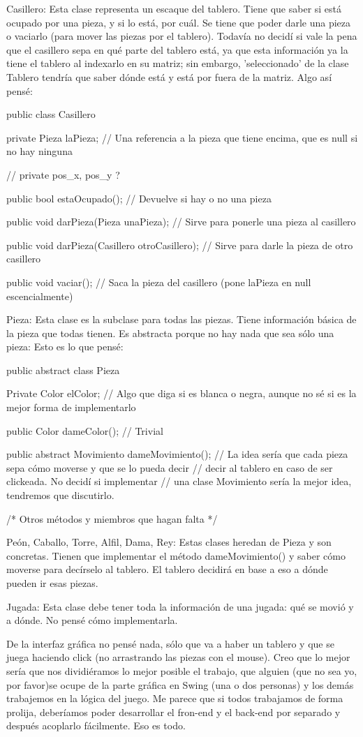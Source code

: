 Casillero:
Esta clase representa un escaque del tablero. Tiene que saber si está ocupado por una pieza, y si lo está, por cuál. Se tiene que poder darle una pieza o vaciarlo (para mover las piezas por el tablero). Todavía no decidí si vale la pena que el casillero sepa en qué parte del tablero está, ya que esta información ya la tiene el tablero al indexarlo en su matriz; sin embargo, 'seleccionado' de la clase Tablero tendría que saber dónde está y está por fuera de la matriz. Algo así pensé:

public class Casillero {
	
	private Pieza laPieza;	// Una referencia a la pieza que tiene encima, que es null si no hay ninguna

	// private pos_x, pos_y ?

	public bool estaOcupado();	// Devuelve si hay o no una pieza

	public void darPieza(Pieza unaPieza);	// Sirve para ponerle una pieza al casillero

	public void darPieza(Casillero otroCasillero);	// Sirve para darle la pieza de otro casillero

	public void vaciar();	// Saca la pieza del casillero (pone laPieza en null escencialmente)

}

Pieza:
Esta clase es la subclase para todas las piezas. Tiene información básica de la pieza que todas tienen. Es abstracta porque no hay nada que sea sólo una pieza: Esto es lo que pensé:

public abstract class Pieza {
	
	Private Color elColor;	// Algo que diga si es blanca o negra, aunque no sé si es la mejor forma de implementarlo

	public Color dameColor();	//	Trivial

	public abstract Movimiento dameMovimiento();	// La idea sería que cada pieza sepa cómo moverse y que se lo pueda decir
													// decir al tablero en caso de ser clickeada. No decidí si implementar
													// una clase Movimiento sería la mejor idea, tendremos que discutirlo.

	/* Otros métodos y miembros que hagan falta */

}

Peón, Caballo, Torre, Alfil, Dama, Rey:
Estas clases heredan de Pieza y son concretas. Tienen que implementar el método dameMovimiento() y saber cómo moverse para decírselo al tablero. El tablero decidirá en base a eso a dónde pueden ir esas piezas.

Jugada:
Esta clase debe tener toda la información de una jugada: qué se movió y a dónde. No pensé cómo implementarla.

De la interfaz gráfica no pensé nada, sólo que va a haber un tablero y que se juega haciendo click (no arrastrando las piezas con el mouse). Creo que lo mejor sería que nos dividiéramos lo mejor posible el trabajo, que alguien (que no sea yo, por favor)se ocupe de la parte gráfica en Swing (una o dos personas) y los demás trabajemos en la lógica del juego. Me parece que si todos trabajamos de forma prolija, deberíamos poder desarrollar el fron-end y el back-end por separado y después acoplarlo fácilmente. Eso es todo.